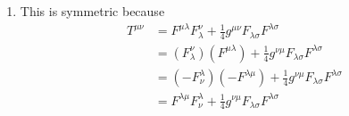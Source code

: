 \documentclass{article}
\begin{document}
\bigskip
\par
\begin{prob}
\end{prob}
\begin{enumerate}[label=(\alph*)]
    \item This is symmetric because
        \begin{align*}
            T^{\mu \nu} &= F^{\mu \lambda} F_\lambda^\nu + \frac{1}{4} g^{\mu \nu} F_{\lambda \sigma} F^{\lambda \sigma} \\
                        &= (F_\lambda^\nu) (F^{\mu \lambda}) + \frac{1}{4} g^{\nu \mu} F_{\lambda \sigma} F^{\lambda \sigma} \\
                        &= (-F_\nu^\lambda) (-F^{\lambda \mu}) + \frac{1}{4} g^{\nu \mu} F_{\lambda \sigma} F^{\lambda \sigma} \\
                        &= F^{\lambda \mu} F_\nu^\lambda + \frac{1}{4} g^{\nu \mu} F_{\lambda \sigma} F^{\lambda \sigma} \\
        \end{align*}
\end{enumerate}



\end{document}
